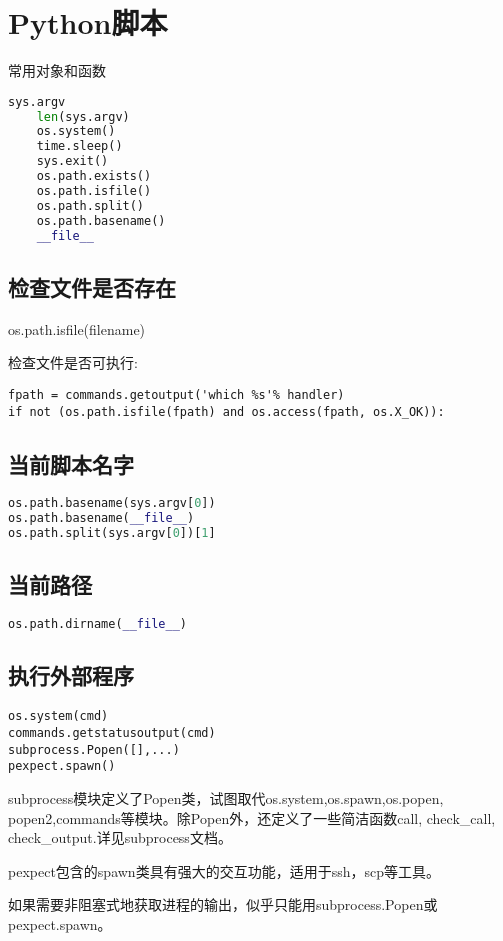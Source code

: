 \section{Python脚本}
常用对象和函数
\begin{lstlisting}[language=Python]
    sys.argv
    len(sys.argv)
    os.system()
    time.sleep()
    sys.exit()
    os.path.exists()
    os.path.isfile()
    os.path.split()
    os.path.basename()
    __file__
\end{lstlisting}

\subsection{检查文件是否存在}
os.path.isfile(filename)

检查文件是否可执行:
\begin{verbatim}
fpath = commands.getoutput('which %s'% handler)
if not (os.path.isfile(fpath) and os.access(fpath, os.X_OK)):
\end{verbatim}
\subsection{当前脚本名字}
\begin{lstlisting}[language=Python]
os.path.basename(sys.argv[0])
os.path.basename(__file__)
os.path.split(sys.argv[0])[1]
\end{lstlisting}

\subsection{当前路径}
\begin{lstlisting}[language=Python]
    os.path.dirname(__file__)
\end{lstlisting}

\subsection{执行外部程序}
\begin{verbatim}
os.system(cmd)
commands.getstatusoutput(cmd)
subprocess.Popen([],...)
pexpect.spawn()
\end{verbatim}
subprocess模块定义了Popen类，试图取代os.system,os.spawn,os.popen, popen2,commands等模块。除Popen外，还定义了一些简洁函数call, check\_call, check\_output.详见subprocess文档。

pexpect包含的spawn类具有强大的交互功能，适用于ssh，scp等工具。

如果需要非阻塞式地获取进程的输出，似乎只能用subprocess.Popen或pexpect.spawn。

